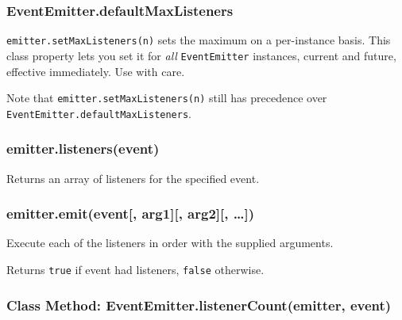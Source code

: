 \subsubsection{EventEmitter.defaultMaxListeners}\label{eventemitter.defaultmaxlisteners}

\texttt{emitter.setMaxListeners(n)} sets the maximum on a per-instance
basis. This class property lets you set it for \emph{all}
\texttt{EventEmitter} instances, current and future, effective
immediately. Use with care.

Note that \texttt{emitter.setMaxListeners(n)} still has precedence over
\texttt{EventEmitter.defaultMaxListeners}.

\subsubsection{emitter.listeners(event)}\label{emitter.listenersevent}

Returns an array of listeners for the specified event.

\begin{Shaded}
\begin{Highlighting}[]
\NormalTok{(}\NormalTok{, } 
  \NormalTok{(}\NormalTok{);}
\NormalTok{\});}
\NormalTok{(}\NormalTok{(}\NormalTok{(}\NormalTok{))); }\CommentTok{// [ [Function] ]}
\end{Highlighting}
\end{Shaded}

\subsubsection{emitter.emit(event{[}, arg1{]}{[}, arg2{]}{[},
\ldots{}{]})}\label{emitter.emitevent-arg1-arg2}

Execute each of the listeners in order with the supplied arguments.

Returns \texttt{true} if event had listeners, \texttt{false} otherwise.

\subsubsection{Class Method: EventEmitter.listenerCount(emitter,
event)}\label{class-method-eventemitter.listenercountemitter-event}

